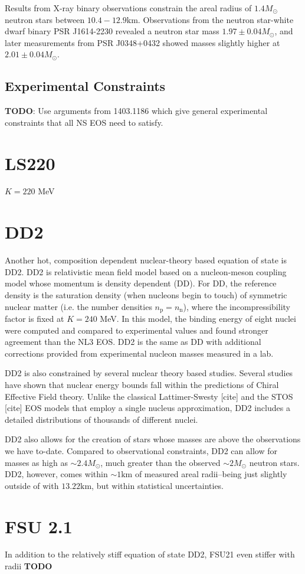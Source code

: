 Results from X-ray binary observations constrain the areal radius of $1.4M_\odot$ neutron stars between $10.4 - 12.9 \textrm{km}$.
Observations from the neutron star-white dwarf binary PSR J1614-2230 revealed a neutron star mass $1.97 \pm 0.04 M_\odot$, and later measurements from PSR J0348+0432 showed masses slightly higher at  $2.01 \pm 0.04 M_\odot$.

\subsection{Experimental Constraints}

\textbf{TODO}: Use arguments from 1403.1186 which give general experimental constraints that all NS EOS need to satisfy. 

\section{LS220}

$K = 220$ MeV

\section{DD2}

Another hot, composition dependent nuclear-theory based equation of state is DD2.  DD2 is relativistic mean field model based on a nucleon-meson coupling model whose momentum is density dependent (DD).  
For DD, the reference density is the saturation density (when nucleons begin to touch) of symmetric nuclear matter (i.e. the number densities $n_\textrm{p} = n_\textrm{n}$), where the incompressibility factor is fixed at $K = 240$ MeV.
In this model, the binding energy of eight nuclei were computed and compared to experimental values and found stronger agreement than the NL3 EOS.
DD2 is the same as DD with additional corrections provided from experimental nucleon masses measured in a lab.

DD2 is also constrained by several nuclear theory based studies.
Several studies have shown that nuclear energy bounds fall within the predictions of Chiral Effective Field theory.
Unlike the classical Lattimer-Swesty [cite] and the STOS [cite] EOS models that employ a single nucleus approximation, DD2 includes a detailed distributions of thousands of different nuclei.

DD2 also allows for the creation of stars whose masses are above the observations we have to-date.
Compared to observational constraints, DD2 can allow for masses as high as $\sim 2.4 M_\odot$, much greater than the observed $\sim 2 M_\odot$ neutron stars.
DD2, however, comes within $\sim 1 \textrm{km}$ of measured areal radii--being just slightly outside of with $13.22 \textrm{km}$, but within statistical uncertainties.

\section{FSU 2.1}

In addition to the relatively stiff equation of state DD2, FSU21 even stiffer with radii \textbf{TODO}



